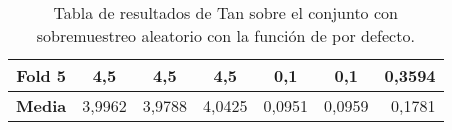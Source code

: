 \begin{table}[H]
{\begin{tabular}{|crrrrrr|}
\multicolumn{1}{|c|}{\textbf{Fold 5}} & \multicolumn{1}{c|}{4,5}               & \multicolumn{1}{c|}{4,5}                 & \multicolumn{1}{c|}{4,5}             & \multicolumn{1}{c|}{0,1}               & \multicolumn{1}{c|}{0,1}                 & \textbf{0,3594}                    \\ \hline
\multicolumn{1}{|c|}{\textbf{Media}}  & \multicolumn{1}{c|}{3,9962}           & \multicolumn{1}{c|}{3,9788}             & \multicolumn{1}{c|}{4,0425}         & \multicolumn{1}{c|}{0,0951}            & \multicolumn{1}{c|}{0,0959}              & 0,1781                            \\ \hline
\end{tabular}%
}
\caption{Tabla de resultados de Tan sobre el conjunto con sobremuestreo aleatorio con la función de por defecto.}\label{tablaTANdefecto}
\end{table}



